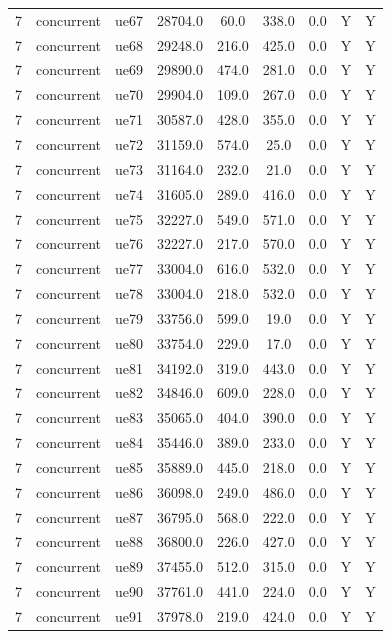\begin{table}[ht]
\begin{tabular}{|c|c|c|c|c|c|c|c|c|}
7 & concurrent & ue67 & 28704.0 & 60.0 & 338.0 & 0.0 & Y & Y \\
7 & concurrent & ue68 & 29248.0 & 216.0 & 425.0 & 0.0 & Y & Y \\
7 & concurrent & ue69 & 29890.0 & 474.0 & 281.0 & 0.0 & Y & Y \\
7 & concurrent & ue70 & 29904.0 & 109.0 & 267.0 & 0.0 & Y & Y \\
7 & concurrent & ue71 & 30587.0 & 428.0 & 355.0 & 0.0 & Y & Y \\
7 & concurrent & ue72 & 31159.0 & 574.0 & 25.0 & 0.0 & Y & Y \\
7 & concurrent & ue73 & 31164.0 & 232.0 & 21.0 & 0.0 & Y & Y \\
7 & concurrent & ue74 & 31605.0 & 289.0 & 416.0 & 0.0 & Y & Y \\
7 & concurrent & ue75 & 32227.0 & 549.0 & 571.0 & 0.0 & Y & Y \\
7 & concurrent & ue76 & 32227.0 & 217.0 & 570.0 & 0.0 & Y & Y \\
7 & concurrent & ue77 & 33004.0 & 616.0 & 532.0 & 0.0 & Y & Y \\
7 & concurrent & ue78 & 33004.0 & 218.0 & 532.0 & 0.0 & Y & Y \\
7 & concurrent & ue79 & 33756.0 & 599.0 & 19.0 & 0.0 & Y & Y \\
7 & concurrent & ue80 & 33754.0 & 229.0 & 17.0 & 0.0 & Y & Y \\
7 & concurrent & ue81 & 34192.0 & 319.0 & 443.0 & 0.0 & Y & Y \\
7 & concurrent & ue82 & 34846.0 & 609.0 & 228.0 & 0.0 & Y & Y \\
7 & concurrent & ue83 & 35065.0 & 404.0 & 390.0 & 0.0 & Y & Y \\
7 & concurrent & ue84 & 35446.0 & 389.0 & 233.0 & 0.0 & Y & Y \\
7 & concurrent & ue85 & 35889.0 & 445.0 & 218.0 & 0.0 & Y & Y \\
7 & concurrent & ue86 & 36098.0 & 249.0 & 486.0 & 0.0 & Y & Y \\
7 & concurrent & ue87 & 36795.0 & 568.0 & 222.0 & 0.0 & Y & Y \\
7 & concurrent & ue88 & 36800.0 & 226.0 & 427.0 & 0.0 & Y & Y \\
7 & concurrent & ue89 & 37455.0 & 512.0 & 315.0 & 0.0 & Y & Y \\
7 & concurrent & ue90 & 37761.0 & 441.0 & 224.0 & 0.0 & Y & Y \\
7 & concurrent & ue91 & 37978.0 & 219.0 & 424.0 & 0.0 & Y & Y \\

\end{tabular}
\end{table}
